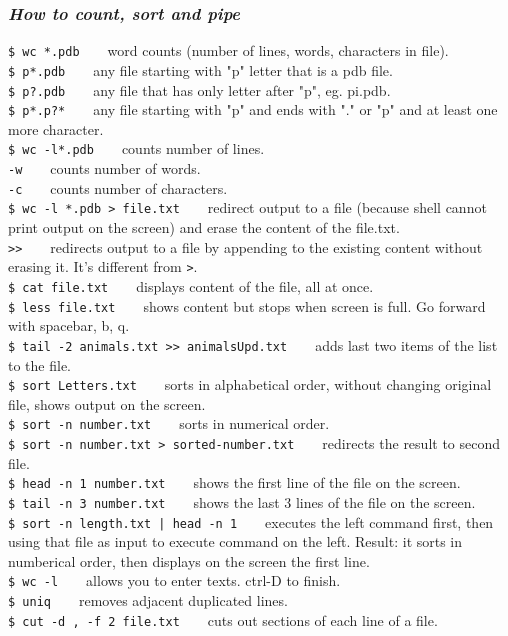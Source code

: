 \documentclass{article}
\begin{document}
\subsubsection{\small\textsl{How to count, sort and pipe}}
\texttt{\$ wc *.pdb} ~ ~ word counts (number of lines, words, characters in file). \\
\texttt{\$ p*.pdb} ~	~ any file starting with "p" letter that is a pdb file.\\
\texttt{\$ p?.pdb} ~ ~ any file that has only letter after "p", eg. pi.pdb.\\
\texttt{\$ p*.p?*} ~	 ~ any file starting with "p" and ends with "." or "p" and at least one more character.\\
\texttt{\$ wc -l*.pdb} ~	~ counts number of lines.\\
\indent\indent \texttt{-w} ~ ~	counts number of words.\\ 
\indent\indent \texttt{-c} ~	~ counts number of characters.\\
\texttt{\$ wc -l *.pdb > file.txt} ~	~ redirect output to a file (because shell cannot print output on the screen) and erase the content of the file.txt. \\
\texttt{>>} ~ ~ redirects output to a file by appending to the existing content without erasing it. It's different from \texttt{>}.\\
\texttt{\$ cat file.txt} ~ ~ displays content of the file, all at once.\\
\texttt{\$ less file.txt} ~ ~ shows content but stops when screen is full. Go forward with spacebar, b, q. \\
\texttt{\$ tail -2 animals.txt >> animalsUpd.txt} ~ ~ adds last two items of the list to the file.\\
\texttt{\$ sort Letters.txt} ~ ~ sorts in alphabetical order, without changing original file, shows output on the screen.\\
\texttt{\$ sort -n number.txt} ~	~ sorts in numerical order.\\
\texttt{\$ sort -n number.txt > sorted-number.txt} ~ ~ redirects the result to second file.\\
\texttt{\$ head -n 1 number.txt} ~ ~ shows the first line of the file on the screen.\\
\texttt{\$ tail -n 3 number.txt} ~ ~ shows the last 3 lines of the file on the screen.\\
\texttt{\$ sort -n length.txt | head -n 1} ~ ~ executes the left command first, then using that file as input to execute command on the left. Result: it sorts in numberical order, then displays on the screen the first line.\\
\texttt{\$ wc -l} ~ ~ allows you to enter texts. ctrl-D to finish.\\
\texttt{\$ uniq} ~ ~ removes adjacent duplicated lines.\\
\texttt{\$ cut -d , -f 2 file.txt} ~ ~ cuts out sections of each line of a file.
\end{document}
